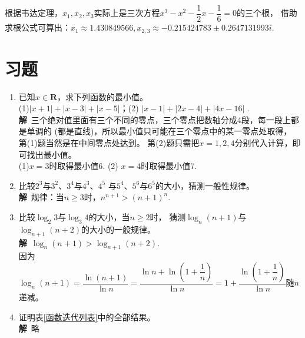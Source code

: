 \begin{enumerate}[label={【\textbf{例\thechapter.\arabic*}】},
 leftmargin=\inteval{\myenumleftmargin}pt,
 itemsep=\inteval{\myenumitempsep}pt,
 itemindent=\inteval{\myenumitemindent}pt]
根据韦达定理，$ x_1,x_2,x_3 $实际上是三次方程$ x^3-x^2-\dfrac{1}{2}x-
\dfrac{1}{6}=0 $的三个根，
借助求根公式可算出：$ x_1 \approx 1.430849566,x_{2,3}\approx -0.215424783 
\pm 0.2647131993 i $. 

\end{enumerate}

\section{习题} 
\begin{enumerate}[label={\textbf{\arabic*.}},leftmargin=
    \inteval{\myenumleftmargin}pt]
\item  已知$ x\in \textbf{R} $，求下列函数的最小值。\\
(1)$ |x+1|+|x-3|+|x-5| $；\quad (2) $ |x-1|+|2x-4|+|4x-16| $ .
\ifteach \\ \textbf{解}\ 
三个绝对值里面有三个不同的零点，三个零点把数轴分成4段，每一段上都是单调的
(都是直线)，所以最小值只可能在三个零点中的某一零点处取得，
第(1)题当然是在中间零点处达到。
第(2)题只需把$ x=1,2,4 $分别代入计算，即可找出最小值。\\
(1)$ x=3 $时取得最小值6. \quad (2) $ x=4 $时取得最小值7. 
\fi

\item 比较$ 2^3 $与$ 3^2 $、$ 3^4 $与$ 4^3 $、$ 4^5 $
与$ 5^4 $、$ 5^6 $与$ 6^5 $的大小，猜测一般性规律。
\ifteach \\
\textbf{解}\ 规律：当$ n\geq 3 $时，$ n^{n+1}>(n+1)^n $. 
\fi

\item 比较$ \log_2 3 $与$ \log_3 4 $的大小，当$ n\geq 2 $时，
猜测$ \log_n (n+1) $与$ \log_{n+1} (n+2) $的大小的一般规律。
\ifteach \\
\textbf{解}\ $ \log_n (n+1) > \log_{n+1} (n+2) $. \\ 因为$ \log_n (n+1)=
\dfrac{\ln (n+1)}{\ln n}=\dfrac{\ln n+\ln\left(1+\dfrac{1}{n}
    \right)}{\ln n}=1+\dfrac{\ln\left(1+\dfrac{1}{n}
    \right)}{\ln n} $随$ n $递减。
\fi

\item 证明表\ref{函数迭代列表}中的全部结果。
\ifteach \\
\textbf{解}\ 略
\fi


\end{enumerate}

